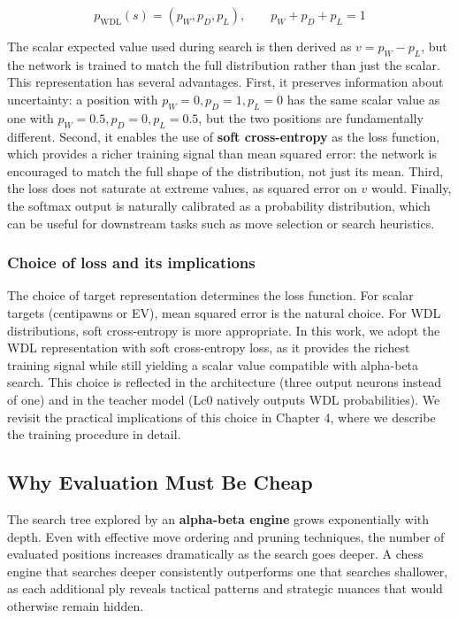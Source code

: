 \[p_{\text{WDL}}(s) = (p_W, p_D, p_L), \qquad p_W + p_D + p_L = 1\]

The scalar expected value used during search is then derived as $v = p_W - p_L$, but the network is trained to match the full distribution rather than just the scalar. This representation has several advantages. First, it preserves information about uncertainty: a position with $p_W = 0, p_D = 1, p_L = 0$ has the same scalar value as one with $p_W = 0.5, p_D = 0, p_L = 0.5$, but the two positions are fundamentally different. Second, it enables the use of \textbf{soft cross-entropy} as the loss function, which provides a richer training signal than mean squared error: the network is encouraged to match the full shape of the distribution, not just its mean. Third, the loss does not saturate at extreme values, as squared error on $v$ would. Finally, the softmax output is naturally calibrated as a probability distribution, which can be useful for downstream tasks such as move selection or search heuristics.

\subsubsection{Choice of loss and its implications}
The choice of target representation determines the loss function. For scalar targets (centipawns or EV), mean squared error is the natural choice. For WDL distributions, soft cross-entropy is more appropriate. In this work, we adopt the WDL representation with soft cross-entropy loss, as it provides the richest training signal while still yielding a scalar value compatible with alpha-beta search. This choice is reflected in the architecture (three output neurons instead of one) and in the teacher model (Lc0 natively outputs WDL probabilities). We revisit the practical implications of this choice in Chapter 4, where we describe the training procedure in detail.

\subsection{Why Evaluation Must Be Cheap}

The search tree explored by an \textbf{alpha-beta engine} grows exponentially with depth. Even with effective move ordering and pruning techniques, the number of evaluated positions increases dramatically as the search goes deeper. A chess engine that searches deeper consistently outperforms one that searches shallower, as each additional ply reveals tactical patterns and strategic nuances that would otherwise remain hidden.

